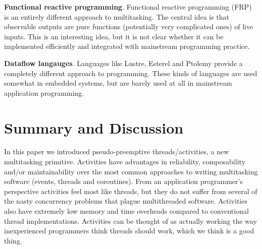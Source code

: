 \documentclass[9pt,preprint]{sigplanconf}
\begin{document}
\textbf{Functional reactive programming}.
Functional reactive programming (FRP) is an entirely different approach to multitasking.
The central idea is that observable outputs are pure functions (potentially very complicated ones) of live inputs.
This is an interesting idea, but it is not clear whether it can be implemented efficiently and integrated with mainstream programming practice.

\textbf{Dataflow langauges}.
Languages like Lustre, Esterel and Ptolemy provide a completely different approach to programming.
These kinds of languages are used somewhat in embedded systems, but are barely used at all in mainstream application programming.

\section{Summary and Discussion}

In this paper we introduced pseudo-preemptive threads/activities, a new multitasking primitive.
Activities have advantages in reliability, composability and/or maintainability over the most common approaches to writing multitasking software (events, threads and coroutines).
From an application programmer's perspective activities feel most like threads, but they do not suffer from several of the nasty concurrency problems that plague multithreaded software.
Activities also have extremely low memory and time overheads compared to conventional thread implementations.
Activities can be thought of as actually working the way inexperienced programmers think threads should work, which we think is a good thing.




% 






\end{document}
